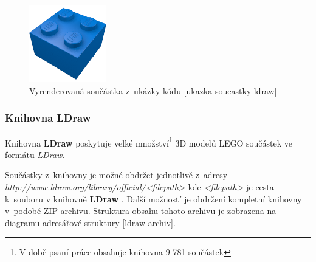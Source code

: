         \begin{figure}[htbp]
            \centering
            \includegraphics[width=0.3\textwidth,height=\textheight,keepaspectratio]{images/3003.png}
            \caption{Vyrenderovaná součástka z~ukázky kódu \ref{ukazka-soucastky-ldraw} \autocite{rebrickable:part:image:3003}\label{obrazek-ldraw-soucastka}}
        \end{figure}

    \subsubsection{Knihovna LDraw}\label{ldraw-knihovna}
    Knihovna \textbf{LDraw} poskytuje velké množství\footnote{V době psaní práce obsahuje knihovna 9 781 součástek} 3D modelů LEGO součástek ve formátu \textit{LDraw}.

    Součástky z~knihovny je možné obdržet jednotlivě z~adresy \\ \textit{http://www.ldraw.org/library/official/<filepath>} kde \textit{<filepath>} je cesta k~souboru v knihovně \textbf{LDraw}  \autocite{ldraw:download}. Další možností je obdržení kompletní knihovny v~podobě ZIP archivu. Struktura obsahu tohoto archivu je zobrazena na diagramu adresářové struktury \ref{ldraw-archiv}.

    \begin{dirfigure}%
        \caption{Obsah archivu complete.zip}\label{ldraw-archiv}
    \end{dirfigure}

